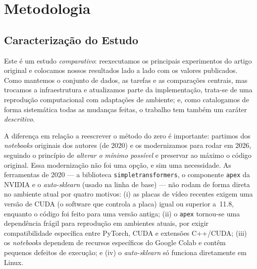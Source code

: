\documentclass[sigconf, nonacm]{acmart}
\begin{document}
\section{Metodologia}
\label{sec:metodologia}
 
\subsection{Caracterização do Estudo}
\label{sec:caracterizacao}
 
Este é um estudo \emph{comparativo}: reexecutamos os principais
experimentos do artigo original e colocamos nossos resultados lado a lado
com os valores publicados. Como mantemos o conjunto de dados, as tarefas e
as comparações centrais, mas trocamos a infraestrutura e atualizamos parte
da implementação, trata-se de uma reprodução computacional com adaptações de
ambiente; e, como catalogamos de forma sistemática todas as mudanças feitas,
o trabalho tem também um caráter \emph{descritivo}.
 
A diferença em relação a reescrever o método do zero é importante:
partimos dos \emph{notebooks} originais dos autores (de 2020) e os
modernizamos para rodar em 2026, seguindo o princípio de \emph{alterar o
mínimo possível} e preservar ao máximo o código original. Essa
modernização não foi uma opção, e sim uma necessidade. As ferramentas de
2020 --- a biblioteca \texttt{simple\allowbreak{}transformers}, o componente
\texttt{apex} da NVIDIA e o \emph{auto-sklearn} (usado na linha de base)
--- não rodam de forma direta no ambiente atual por quatro motivos: (i) as
placas de vídeo recentes exigem uma versão de CUDA (o software que controla
a placa) igual ou superior a~11.8, enquanto o código foi feito para uma
versão antiga; (ii) o \texttt{apex} tornou-se uma dependência frágil para
reprodução em ambientes atuais, por exigir compatibilidade específica entre
PyTorch, CUDA e extensões C++/CUDA; (iii) os \emph{notebooks} dependem de
recursos específicos do Google Colab e contêm pequenos defeitos de
execução; e (iv) o \emph{auto-sklearn} só funciona diretamente em Linux.
 
\end{document}
